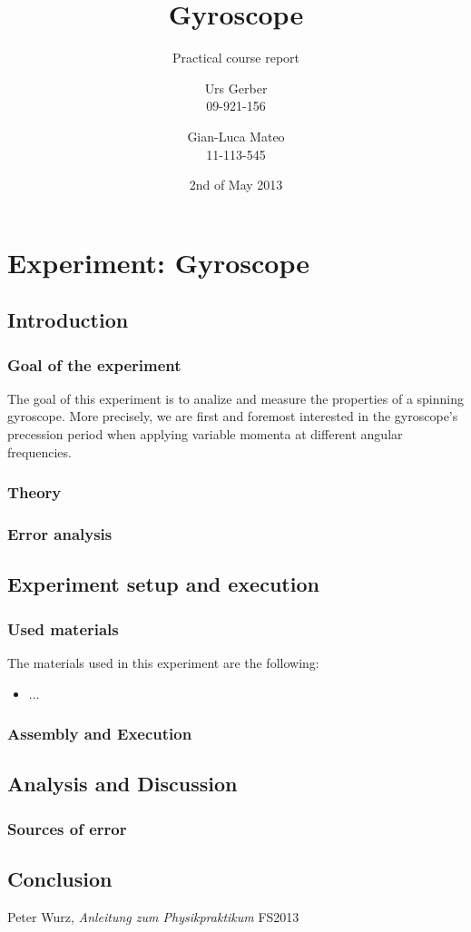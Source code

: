 \documentclass{scrreprt}
\author{Urs Gerber\\09-921-156 \and Gian-Luca Mateo\\11-113-545}
\date{2nd of May 2013}
\title{Gyroscope}
\subtitle{Practical course report}
\begin{document}
\maketitle

\tableofcontents
\newpage

\chapter{Experiment: Gyroscope}

\section{Introduction}

\subsection{Goal of the experiment}
The goal of this experiment is to analize and measure the properties of a spinning gyroscope. More precisely, we are first and foremost interested in the gyroscope's precession period when applying variable momenta at different angular frequencies.
 
\subsection{Theory}
\subsection{Error analysis}

\section{Experiment setup and execution}

\subsection{Used materials}
The materials used in this experiment are the following:
\begin{itemize}
\item ...
\end{itemize}

\subsection{Assembly and Execution}

\section{Analysis and Discussion}

\subsection{Sources of error}

\section{Conclusion}

\begin{thebibliography}{9}

  Peter Wurz,
  \emph{Anleitung zum Physikpraktikum}
  FS2013

\end{thebibliography}
\end{document}
